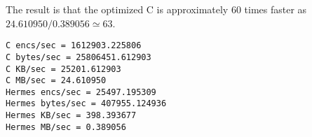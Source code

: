 The result is that the optimized C is approximately 60 times faster as $24.610950 / 0.389056 \simeq 63$.
\begin{lstlisting}[float=htp]
C encs/sec = 1612903.225806
C bytes/sec = 25806451.612903
C KB/sec = 25201.612903
C MB/sec = 24.610950
Hermes encs/sec = 25497.195309
Hermes bytes/sec = 407955.124936
Hermes KB/sec = 398.393677
Hermes MB/sec = 0.389056
\end{lstlisting}
